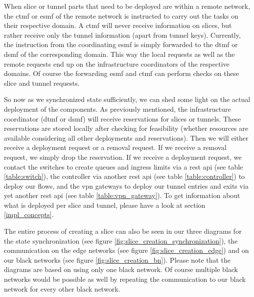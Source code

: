When slice or tunnel parts that need to be deployed are within a remote network, the \acrshort{ctmf} or \acrshort{esmf} of the remote network is instructed to carry out the tasks on their respective domain. A \acrshort{ctmf} will never receive information on slices, but rather receive only the tunnel information (apart from tunnel keys). Currently, the instruction from the coordinating \acrshort{esmf} is simply forwarded to the \acrshort{dtmf} or \acrshort{dsmf} of the corresponding domain. This way the local requests as well as the remote requests end up on the infrastructure coordinators of the respective domains. Of course the forwarding \acrshort{esmf} and \acrshort{ctmf} can perform checks on these slice and tunnel requests.

So now as we synchronized state sufficiently, we can shed some light on the actual deployment of the components. As previously mentioned, the infrastructure coordinator (\acrshort{dtmf} or \acrshort{dsmf}) will receive reservations for slices or tunnels. These reservations are stored locally after checking for feasibility (whether resources are available considering all other deployments and reservations). Then we will either receive a deployment request or a removal request. If we receive a removal request, we simply drop the reservation. If we receive a deployment request, we contact the switches to create queues and ingress limits via a \acrshort{rest} \acrshort{api} (see table \ref{table:switch}), the controller via another \acrshort{rest} \acrshort{api} (see table \ref{table:controller}) to deploy our flows, and the \acrshort{vpn} gateways to deploy our tunnel entries and exits via yet another \acrshort{rest} \acrshort{api} (see table \ref{table:vpn_gateway}). To get information about what is deployed per slice and tunnel, please have a look at section \ref{impl_concepts}.

The entire process of creating a slice can also be seen in our three diagrams for the state synchronization (see figure \ref{fig:slice_creation_synchronization}), the communication on the edge networks (see figure \ref{fig:slice_creation_edge}) and on our black networks (see figure \ref{fig:slice_creation_bn}). Please note that the diagrams are based on using only one black network. Of course multiple black networks would be possible as well by repeating the communication to our black network for every other black network.

\newpage

